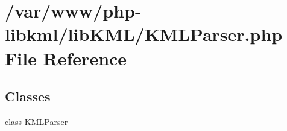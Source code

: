 \hypertarget{KMLParser_8php}{
\section{/var/www/php-\/libkml/libKML/KMLParser.php File Reference}
\label{d3/d21/KMLParser_8php}
}
\subsection*{Classes}
\begin{DoxyCompactItemize}
\item 
class \hyperlink{classKMLParser}{KMLParser}
\end{DoxyCompactItemize}
